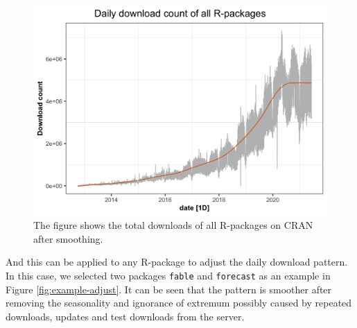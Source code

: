 \documentclass[
]{book}
\begin{document}
\begin{figure}

{\centering \includegraphics{figures/pkg-stl-1} 

}

\caption{The figure shows the total downloads of all R-packages on CRAN after smoothing.}\label{fig:pkg-stl}
\end{figure}

And this can be applied to any R-package to adjust the daily download pattern. In this case, we selected two packages \texttt{fable} and \texttt{forecast} as an example in Figure \ref{fig:example-adjust}. It can be seen that the pattern is smoother after removing the seasonality and ignorance of extremum possibly caused by repeated downloads, updates and test downloads from the server.
\end{document}
